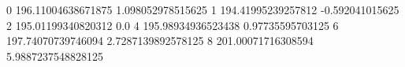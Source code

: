 0 196.11004638671875 1.098052978515625
1 194.41995239257812 -0.592041015625
2 195.01199340820312 0.0
4 195.98934936523438 0.97735595703125
6 197.74070739746094 2.7287139892578125
8 201.00071716308594 5.9887237548828125

